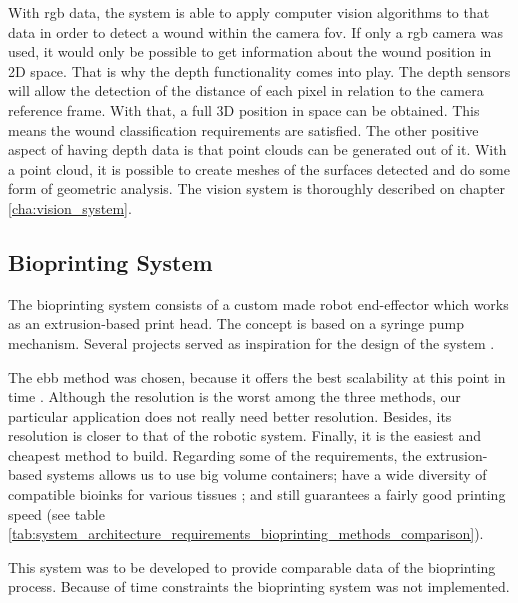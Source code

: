 With \gls{rgb} data, the system is able to apply computer vision algorithms to that data in order to detect a wound within the camera \gls{fov}. If only a \gls{rgb} camera was used, it would only be possible to get information about the wound position in 2D space. That is why the depth functionality comes into play. The depth sensors will allow the detection of the distance of each pixel in relation to the camera reference frame. With that, a full 3D position in space can be obtained. This means the wound classification requirements are satisfied. The other positive aspect of having depth data is that point clouds can be generated out of it. With a point cloud, it is possible to create meshes of the surfaces detected and do some form of geometric analysis. The vision system is thoroughly described on chapter \ref{cha:vision_system}.


\subsection*{Bioprinting System}
\label{subsec:system_architecture_components_bioprinting_system}

The bioprinting system consists of a custom made robot end-effector which works as an extrusion-based print head. The concept is based on a syringe pump mechanism. Several projects served as inspiration for the design of the system \cite{Wijnen2014_open_source_syring_pump_library,Pusch2018_large_volume_syringe_pump_extruder_desktop_3d_printers,Booeshaghi2019_principles_open_source_bioinstrumentation_poseidon}.

The \gls{ebb} method was chosen, because it offers the best scalability at this point in time \cite{Vijayavenkataraman2018_bioprinting_tissues_organs_regen_med}. Although the resolution is the worst among the three methods, our particular application does not really need better resolution. Besides, its resolution is closer to that of the robotic system. Finally, it is the easiest and cheapest method to build. Regarding some of the requirements, the extrusion-based systems allows us to use big volume containers; have a wide diversity of compatible bioinks for various tissues  \cite{Hospodiuk2017_bioink_comprehensive_review_bioprintable_materials}; and still guarantees a fairly good printing speed (see table \ref{tab:system_architecture_requirements_bioprinting_methods_comparison}).

This system was to be developed to provide comparable data of the bioprinting process. Because of time constraints the bioprinting system was not implemented.


